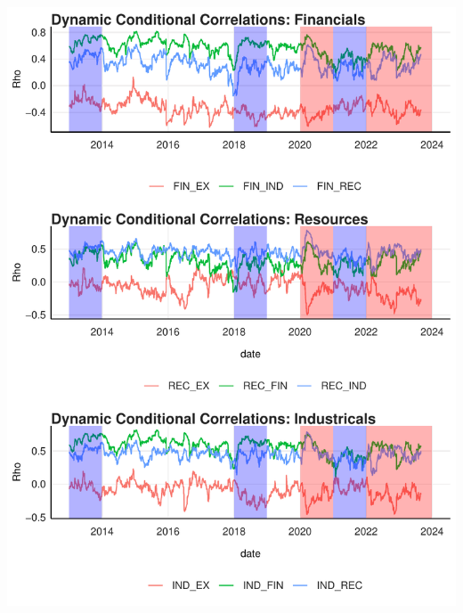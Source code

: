 \documentclass[12pt,preprint, authoryear]{elsarticle}
\let\origfigure\figure
\let\endorigfigure\endfigure
\renewenvironment{figure}[1][2] {
    \expandafter\origfigure\expandafter[H]
} {
    \endorigfigure
}
\numberwithin{equation}{section}
\numberwithin{figure}{section}
\numberwithin{table}{section}
\begin{document}
\begin{figure}[H]

{\centering \includegraphics{WriteUp_files/figure-latex/Figure2-1} 

}

\caption{DCC  \label{Figure2}}\label{fig:Figure2}
\end{figure}
\end{document}

